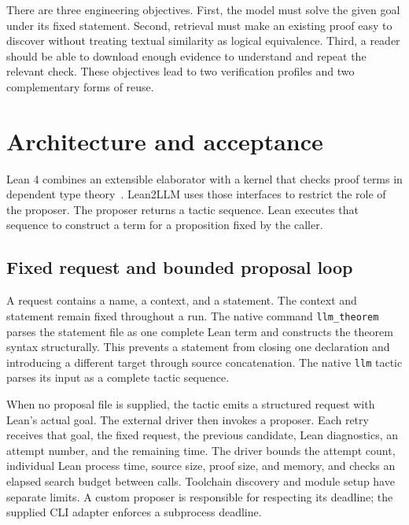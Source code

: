 \documentclass[10pt,a4paper]{article}
\newcommand{\code}[1]{\texttt{#1}}
\begin{document}
There are three engineering objectives. First, the model must solve the given
goal under its fixed statement. Second, retrieval must make an
existing proof easy to discover without treating textual similarity as logical
equivalence. Third, a reader should be able to download enough evidence to
understand and repeat the relevant check. These objectives lead to two
verification profiles and two complementary forms of reuse.

\section{Architecture and acceptance}
Lean 4 combines an extensible elaborator with a kernel that checks proof terms
in dependent type theory~\cite{lean4}. Lean2LLM uses those interfaces to restrict
the role of the proposer. The proposer returns a tactic sequence. Lean executes
that sequence to construct a term for a proposition fixed by the caller.

\subsection{Fixed request and bounded proposal loop}
A request contains a name, a context, and a statement. The context and statement
remain fixed throughout a run. The native command \code{llm\_theorem} parses the
statement file as one complete Lean term and constructs the theorem syntax
structurally. This prevents a statement from closing one declaration and
introducing a different target through source concatenation. The native
\code{llm} tactic parses its input as a complete tactic sequence.

When no proposal file is supplied, the tactic emits a structured request with
Lean's actual goal. The external driver then invokes a proposer. Each retry
receives that goal, the fixed request, the previous candidate, Lean diagnostics,
an attempt number, and the remaining time. The driver bounds the attempt count,
individual Lean process time, source size, proof size, and memory, and checks an
elapsed search budget between calls. Toolchain discovery and module setup have
separate limits. A custom proposer is responsible for respecting its deadline;
the supplied CLI adapter enforces a subprocess deadline.

\begin{center}
\end{center}
\end{document}
